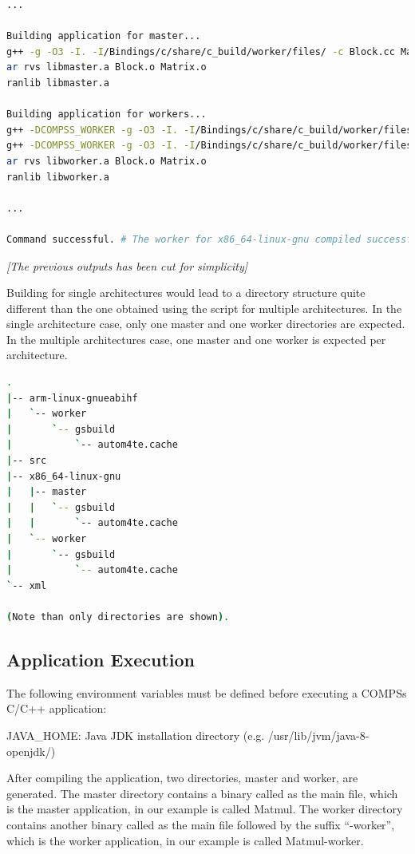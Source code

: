 \begin{lstlisting}[language=bash]
...

Building application for master...
g++ -g -O3 -I. -I/Bindings/c/share/c_build/worker/files/ -c Block.cc Matrix.cc 
ar rvs libmaster.a Block.o Matrix.o
ranlib libmaster.a

Building application for workers...
g++ -DCOMPSS_WORKER -g -O3 -I. -I/Bindings/c/share/c_build/worker/files/ -c Block.cc -o Block.o
g++ -DCOMPSS_WORKER -g -O3 -I. -I/Bindings/c/share/c_build/worker/files/ -c Matrix.cc -o Matrix.o
ar rvs libworker.a Block.o Matrix.o 
ranlib libworker.a

... 

Command successful. # The worker for x86_64-linux-gnu compiled successfuly

\end{lstlisting}

\emph{[The previous outputs has been cut for simplicity]}
\newline

Building for single architectures would lead to a directory structure quite different than the one obtained using the script for multiple architectures. In the single architecture case, only one master and one worker directories are expected. In the multiple architectures case, one master and one worker is expected per architecture.

\begin{lstlisting}[language=bash]
.
|-- arm-linux-gnueabihf
|   `-- worker
|       `-- gsbuild
|           `-- autom4te.cache
|-- src
|-- x86_64-linux-gnu
|   |-- master
|   |   `-- gsbuild
|   |       `-- autom4te.cache
|   `-- worker
|       `-- gsbuild
|           `-- autom4te.cache
`-- xml

(Note than only directories are shown).

\end{lstlisting}

\subsection{Application Execution}

The following environment variables must be defined before executing a COMPSs C/C++ application:
            
JAVA\_HOME: Java JDK installation directory (e.g. /usr/lib/jvm/java-8-openjdk/)

After compiling the application, two directories, master and worker, are generated. 
The master directory contains a binary called as the main file, which is the master application, in our 
example is called Matmul. The worker directory contains another binary called as the main file followed 
by the suffix ``-worker'', which is the worker application, in our example is called Matmul-worker.

